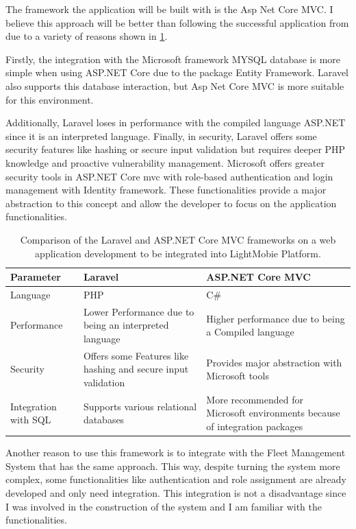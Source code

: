 The framework the application will be built with is the Asp Net Core MVC. 
I believe this approach will be better than following the successful application from \citet{MAS_MOTORS} due to a variety of reasons shown in \ref{table:architetcture_comparison}.

Firstly, the integration with the Microsoft framework MYSQL database is more simple when using ASP.NET Core due to the package Entity Framework. %
Laravel also supports this database interaction, but Asp Net Core MVC is more suitable for this environment. ~\cite{asp_net_vs_laravel}

Additionally, Laravel loses in performance with the compiled language ASP.NET since it is an interpreted language. 
Finally, in security, Laravel offers some security features like hashing or secure input validation but requires deeper PHP knowledge and proactive vulnerability management. 
Microsoft offers greater security tools in ASP.NET Core mvc with role-based authentication and login management with Identity framework.
These functionalities provide a major abstraction to this concept and allow the developer to focus on the application functionalities. ~\cite{asp_net_vs_laravel}


\begin{table}[]
    \begin{tabular}{| m{5em} | m{15em} | m{15em} |}
      \hline
   Parameter & Laravel  & ASP.NET Core MVC   \\
     \hline
   Language & PHP & C\#  \\
     \hline
   Performance & Lower Performance due to being an interpreted language & Higher performance due to being a Compiled language   \\
     \hline
   Security & Offers some Features like hashing and secure input validation & Provides major abstraction with Microsoft tools   \\
     \hline
   Integration with SQL & Supports various relational databases & More recommended for Microsoft environments because of integration packages  \\
     \hline
  \end{tabular}
    \caption{Comparison of the Laravel and ASP.NET Core MVC frameworks on a web application development to be integrated into LightMobie Platform.}
    \label{table:architetcture_comparison}
    \end{table}

  Another reason to use this framework is to integrate with the Fleet Management System that has the same approach. 
  This way, despite turning the system more complex, some functionalities like authentication and role assignment are already developed and only need integration. 
  This integration is not a disadvantage since I was involved in the construction of the system and I am familiar with the functionalities.
  
  



